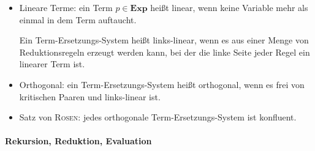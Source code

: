 \documentclass[
  a4paper,
  11pt,
]{scrartcl}
\begin{document}
\begin{itemize}
  \item Lineare Terme: ein Term $p \in \textbf{Exp}$ heißt linear, wenn keine
    Variable mehr als einmal in dem Term auftaucht.

    Ein Term-Ersetzungs-System heißt links-linear, wenn es aus einer Menge von
    Reduktionsregeln erzeugt werden kann, bei der die linke Seite jeder Regel
    ein linearer Term ist.

  \item Orthogonal: ein Term-Ersetzungs-System heißt orthogonal, wenn es frei
    von kritischen Paaren und links-linear ist.

  \item Satz von \textsc{Rosen}: jedes orthogonale Term-Ersetzungs-System ist
    konfluent.
\end{itemize}

\paragraph{Rekursion, Reduktion, Evaluation}
\label{par:rekursion_reduktion_evaluation}
\end{document}
